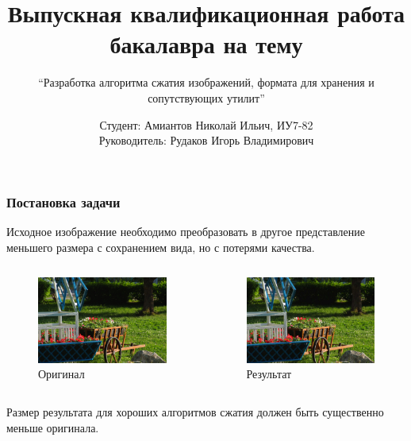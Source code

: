 \documentclass{beamer}
\title[ВКР]{Выпускная квалификационная работа бакалавра на тему}
\subtitle{``Разработка алгоритма сжатия изображений, формата для хранения и сопутствующих утилит''}
\author{Студент: {Амиантов Николай Ильич, ИУ7-82}\\Руководитель: {Рудаков Игорь Владимирович}}
\date{}
\begin{document}
\frame{\titlepage}

\begin{frame}
\frametitle{Постановка задачи}

Исходное изображение необходимо преобразовать в другое представление меньшего
размера с сохранением вида, но с потерями качества.

\begin{columns}[T]
  \begin{column}{0.45\textwidth}
    \begin{figure}
      \includegraphics[width=\textwidth]{img/task}
      \caption{Оригинал}
    \end{figure}
  \end{column}

  \begin{column}{0.45\textwidth}
    \begin{figure}
      \includegraphics[width=\textwidth]{img/task_comp}
      \caption{Результат}
    \end{figure}
  \end{column}
\end{columns}

Размер результата для хороших алгоритмов сжатия должен быть существенно меньше оригинала.
\end{frame}
\end{document}
